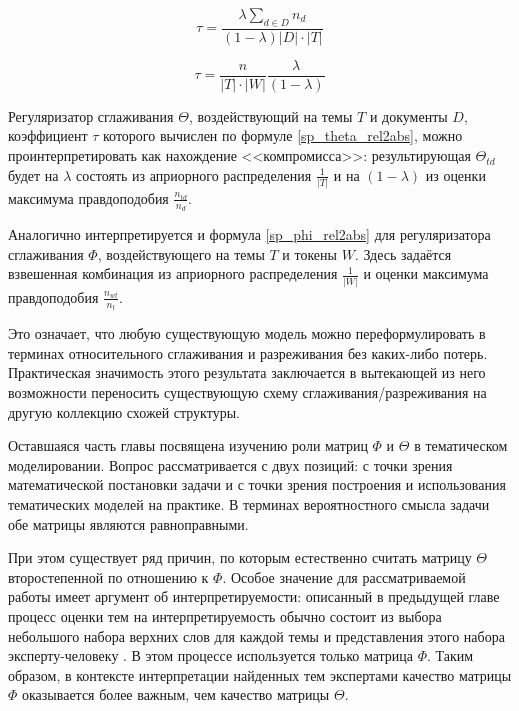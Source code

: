 \begin{equation}
\tau = \frac{\lambda \sum_{d\in D} n_d }{(1-\lambda) |D| \cdot |T|} \label{sp_theta_rel2abs}
\end{equation}

\begin{equation}
\tau = \frac{n}{|T|\cdot|W|} \frac{\lambda}{(1-\lambda)}  \label{sp_phi_rel2abs}
\end{equation}

Регуляризатор сглаживания $\Theta$, воздействующий на темы $T$ и документы $D$, коэффициент $\tau$ которого вычислен по формуле \eqref{sp_theta_rel2abs}, можно проинтерпретировать как нахождение <<компромисса>>: результирующая $\Theta_{td}$ будет на $\lambda$ состоять из априорного распределения $\frac{1}{|T|}$ и на $(1-\lambda)$ из оценки максимума правдоподобия $\frac{n_{td}}{n_d}$.

Аналогично интерпретируется и формула \eqref{sp_phi_rel2abs} для регуляризатора сглаживания $\Phi$, воздействующего на темы $T$ и токены $W$. Здесь задаётся взвешенная комбинация из априорного распределения $\frac{1}{|W|}$ и оценки максимума правдоподобия $\frac{n_{wt}}{n_t}$.

Это означает, что любую существующую модель можно переформулировать в терминах относительного сглаживания и разреживания без каких-либо потерь. Практическая значимость этого результата заключается в вытекающей из него возможности переносить существующую схему сглаживания/разреживания на другую коллекцию схожей структуры.

Оставшаяся часть главы посвящена изучению роли матриц $\Phi$ и $\Theta$ в тематическом моделировании. Вопрос рассматривается с двух позиций: с точки зрения математической постановки задачи и с точки зрения построения и использования тематических моделей на практике. В терминах вероятностного смысла задачи обе матрицы являются равноправными.

При этом существует ряд причин, по которым естественно считать матрицу $\Theta$ второстепенной по отношению к $\Phi$. Особое значение для рассматриваемой работы имеет аргумент об интерпретируемости: описанный в предыдущей главе процесс оценки тем на интерпретируемость обычно состоит из выбора небольшого набора верхних слов для каждой темы и представления этого набора эксперту-человеку \cite{roder2015exploring}. В этом процессе используется только матрица $\Phi$. Таким образом, в контексте интерпретации найденных тем экспертами качество матрицы $\Phi$ оказывается более важным, чем качество матрицы $\Theta$.

